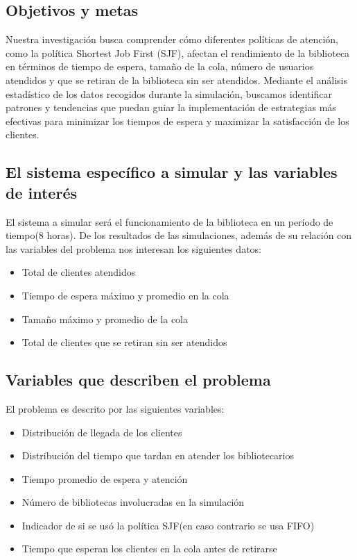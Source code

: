\documentclass[10pt,twocolumn]{article}
\begin{document}
\subsection{Objetivos y metas}
Nuestra investigación busca comprender cómo diferentes políticas de atención, como la política Shortest Job First (SJF), afectan el rendimiento de la biblioteca en términos de tiempo de espera, tamaño de la cola, número de usuarios atendidos y que se retiran de la biblioteca sin ser atendidos. Mediante el análisis estadístico de los datos recogidos durante la simulación, buscamos identificar patrones y tendencias que puedan guiar la implementación de estrategias más efectivas para minimizar los tiempos de espera y maximizar la satisfacción de los clientes.

\subsection{El sistema específico a simular y las variables de interés}
El sistema a simular será el funcionamiento de la biblioteca en un período de tiempo(8 horas). De los resultados de las simulaciones, además de su relación con las variables del problema nos interesan los siguientes datos:
\begin{itemize}
	\item Total de clientes atendidos
	\item Tiempo de espera máximo y promedio en la cola
	\item Tamaño máximo y promedio de la cola
	\item Total de clientes que se retiran sin ser atendidos
\end{itemize}

\subsection{Variables que describen el problema}
El problema es descrito por las siguientes variables:
\begin{itemize}
	\item Distribución de llegada de los clientes
	\item Distribución del tiempo que tardan en atender los bibliotecarios
	\item Tiempo promedio de espera y atención
	\item Número de bibliotecas involucradas en la simulación
	\item Indicador de si se usó la política SJF(en caso contrario se usa FIFO)
	\item Tiempo que esperan los clientes en la cola antes de retirarse
\end{itemize}
\end{document}
